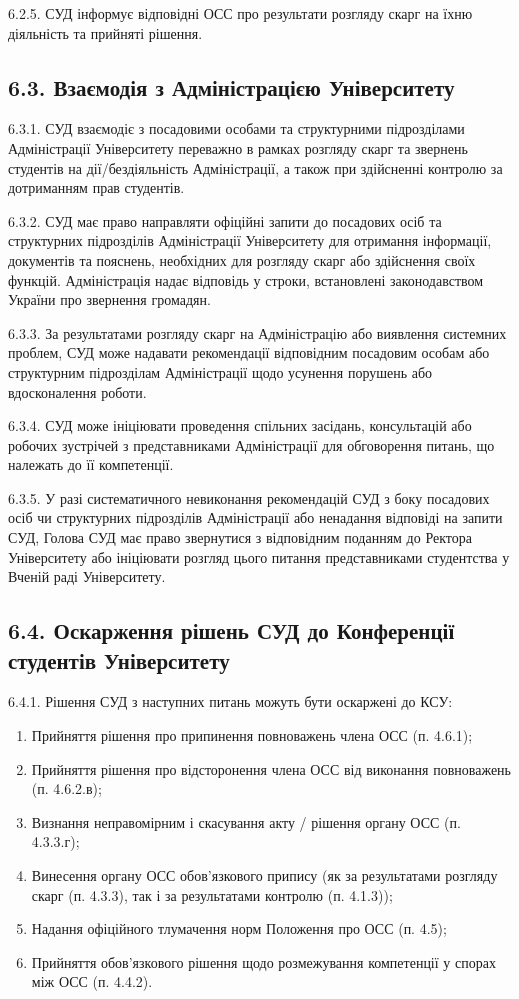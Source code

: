     6.2.5. СУД інформує відповідні ОСС про результати розгляду скарг на їхню діяльність та прийняті рішення.

\subsection*{6.3. Взаємодія з Адміністрацією Університету}
    6.3.1. СУД взаємодіє з посадовими особами та структурними підрозділами Адміністрації Університету переважно в рамках розгляду скарг та звернень студентів на дії/бездіяльність Адміністрації, а також при здійсненні контролю за дотриманням прав студентів.

    6.3.2. СУД має право направляти офіційні запити до посадових осіб та структурних підрозділів Адміністрації Університету для отримання інформації, документів та пояснень, необхідних для розгляду скарг або здійснення своїх функцій. Адміністрація надає відповідь у строки, встановлені законодавством України про звернення громадян.

    6.3.3. За результатами розгляду скарг на Адміністрацію або виявлення системних проблем, СУД може надавати рекомендації відповідним посадовим особам або структурним підрозділам Адміністрації щодо усунення порушень або вдосконалення роботи.

    6.3.4. СУД може ініціювати проведення спільних засідань, консультацій або робочих зустрічей з представниками Адміністрації для обговорення питань, що належать до її компетенції.

    6.3.5. У разі систематичного невиконання рекомендацій СУД з боку посадових осіб чи структурних підрозділів Адміністрації або ненадання відповіді на запити СУД, Голова СУД має право звернутися з відповідним поданням до Ректора Університету або ініціювати розгляд цього питання представниками студентства у Вченій раді Університету.

\subsection*{6.4. Оскарження рішень СУД до Конференції студентів Університету}
    6.4.1. Рішення СУД з наступних питань можуть бути оскаржені до КСУ:
        \begin{enumerate}[label=\alph*)]
            \item Прийняття рішення про припинення повноважень члена ОСС (п. 4.6.1);
            \item Прийняття рішення про відсторонення члена ОСС від виконання повноважень (п. 4.6.2.в);
            \item Визнання неправомірним і скасування акту / рішення органу ОСС (п. 4.3.3.г);
            \item Винесення органу ОСС обов'язкового припису (як за результатами розгляду скарг (п. 4.3.3), так і за результатами контролю (п. 4.1.3));
            \item Надання офіційного тлумачення норм Положення про ОСС (п. 4.5);
            \item Прийняття обов'язкового рішення щодо розмежування компетенції у спорах між ОСС (п. 4.4.2).
        \end{enumerate}

